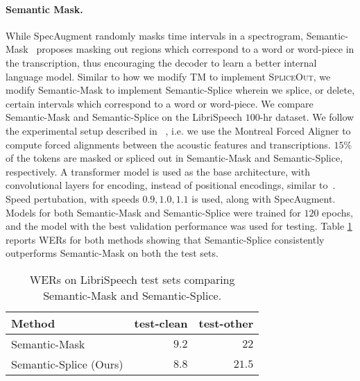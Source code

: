 \documentclass{article}
\newcommand{\SpA}{{\textsc{SpliceOut}}\xspace}
\begin{document}
\paragraph*{Semantic Mask.} While SpecAugment randomly masks time intervals in a spectrogram, Semantic-Mask~\citep{semanticmask} proposes masking out regions which correspond to a word or word-piece in the transcription, thus encouraging the decoder to learn a better internal language model. Similar to how we modify TM to implement \SpA, we modify Semantic-Mask to implement Semantic-Splice wherein we splice, or delete, certain intervals which correspond to a word or word-piece. We compare Semantic-Mask and Semantic-Splice on the LibriSpeech $100$-hr dataset. We follow the experimental setup described in ~\citep{semanticmask}, i.e. we use the Montreal Forced Aligner to compute forced alignments between the acoustic features and transcriptions. $15\%$ of the tokens are masked or spliced out in Semantic-Mask and Semantic-Splice, respectively. A transformer model is used as the base architecture, with convolutional layers for encoding, instead of positional encodings, similar to~\citep{semanticmask}. Speed pertubation, with speeds $0.9, 1.0, 1.1$ is used, along with SpecAugment. Models for both Semantic-Mask and Semantic-Splice were trained for $120$ epochs, and the model with the best validation performance was used for testing. Table \ref{tab:semantic} reports WERs for both methods showing that Semantic-Splice consistently outperforms Semantic-Mask on both the test sets. 

\begin{table}[h]
    \centering
    \caption{WERs on LibriSpeech test sets comparing Semantic-Mask and Semantic-Splice.}
    \begin{tabular}{lrr}
    \toprule
     Method & test-clean & test-other\\
    \midrule
    Semantic-Mask~\cite{semanticmask} & $9.2$ & $22$\\
    Semantic-Splice (Ours) & $\mathbf{8.8}$ & $\mathbf{21.5}$\\
    \bottomrule
    \end{tabular}
    \label{tab:semantic}
\end{table}



\end{document}
